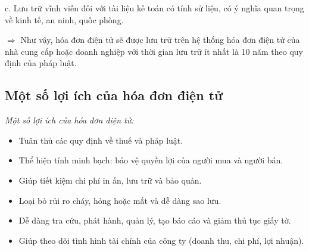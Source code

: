 c. Lưu trữ vĩnh viễn đối với tài liệu kế toán có tính sử liệu, có ý nghĩa quan trọng về kinh tế, an ninh, quốc phòng.



$\Rightarrow$ Như vậy, hóa đơn điện tử sẽ được lưu trữ trên hệ thống hóa đơn điện tử của nhà cung cấp hoặc doanh nghiệp với thời gian lưu trữ ít nhất là 10 năm theo quy định của pháp luật.

\subsection{Một số lợi ích của hóa đơn điện tử}

\emph{Một số lợi ích của hóa đơn điện tử:}

\begin{itemize}

\item Tuân thủ các quy định về thuế và pháp luật.

\item Thể hiện tính minh bạch: bảo vệ quyền lợi của người mua và người bán.

\item Giúp tiết kiệm chi phí in ấn, lưu trữ và bảo quản.

\item Loại bỏ rủi ro cháy, hỏng hoặc mất và dễ dàng sao lưu.

\item Dễ dàng tra cứu, phát hành, quản lý, tạo báo cáo và giảm thủ tục giấy tờ.

\item Giúp theo dõi tình hình tài chính của công ty (doanh thu, chi phí, lợi nhuận).

\end{itemize}

